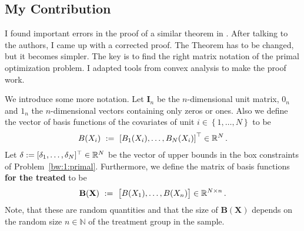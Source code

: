 \subsection*{My Contribution}
I found important errors in the proof of a similar theorem in \cite{Wang2019}. After talking to the authors, I came up with a corrected proof. The Theorem has to be changed, but it becomes simpler. The key is to find the right matrix notation of the primal optimization problem. I adapted tools from convex analysis to make the proof work.

We introduce some more notation. Let $\mathbf{I}_n$ be the $n$-dimensional unit matrix, $\mathrm{0}_n$ and $\mathrm{1}_n$ the $n$-dimensional vectors containing only zeros or ones.
Also we define the vector of basis functions of the covariates of unit 
$i\in \left\{ 1,\ldots,N \right\}$ to be
\begin{gather*}
     B(X_i)
    \ 
    :=
    \ 
    \left[ 
      B_1(X_i)
      ,
      \ldots
      ,
      B_N(X_i)
    \right]
    ^\top
    \in
    \R^N
    \,.
\end{gather*}
Let $\delta:=[\delta_1,\ldots,\delta_N]^\top\in \mathbb{R}^N$ be the vector of upper bounds in the box constraints of Problem~\ref{bw:1:primal}.
Furthermore, we define the matrix of basis functions \textbf{for the treated} to be
\begin{gather*}
    \mathbf{B}(\mathbf{X})
    \ 
    :=
    \ 
    \begin{bmatrix}
      B(X_1), \ldots, B(X_n)
    \end{bmatrix}
    \in\R^{N\times n}
    \,.
\end{gather*}
Note, that these are random quantities and that the size of $\mathbf{B}(\mathbf{X})$ depends on the random size $n\in\mathbb{N}$ of the treatment group in the sample.

